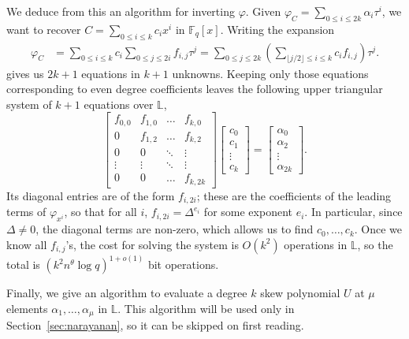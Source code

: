 \documentclass[sigconf]{acmart}
\newcommand{\F}{\mathbb{F}}
\renewcommand{\L}{\mathbb{L}}
\begin{document}
\smallskip{}  We deduce from this an algorithm for
inverting $\varphi$.  Given
$\varphi_C = \sum_{0 \le i \le 2k} \alpha_i \tau^i$, we want to
recover $C =\sum_{0 \le i \le k} c_ix^i $ in $\F_q[x]$. Writing the
expansion
\begin{align*}\label{eq:phic}
\varphi_C &= \sum_{0 \le i \le k} c_i \sum_{0 \le j \le 2i} f_{i,j} \tau^j = \sum_{0 \le j \le 2k}  \left (\sum_{\lfloor j/2\rfloor \le i \le k} c_i f_{i,j} \right) \tau^j.
\end{align*}
gives us $2k+1$ equations in $k+1$
unknowns. Keeping only those equations corresponding to even degree
coefficients leaves the following upper triangular system of $k + 1$
equations over $\L$,
\begin{equation}
\begin{bmatrix} f_{0,0} & f_{1,0} & \ldots & f_{k, 0} \\
                 0      & f_{1,2} & \ldots & f_{k, 2}  \\
                 0      & 0       & \ddots & \vdots                      \\
                 \vdots  & \vdots  &  \ddots      & \vdots                       \\
                 0  & 0 & \ldots & f_{k, 2k}
\end{bmatrix}
\begin{bmatrix}
  c_0 \\ c_1 \\ \vdots \\ c_k
\end{bmatrix} = \begin{bmatrix} \alpha_{0} \\ \alpha_{2} \\ \vdots \\ \alpha_{2k} \end{bmatrix}.
\end{equation}
Its diagonal entries are of the form $f_{i,2i}$; these are the
coefficients of the leading terms of $\varphi_{x^i}$, so that for all
$i$, $f_{i,2i} = \Delta^{e_i}$ for some exponent $e_i$. In particular,
since $\Delta \neq 0$, the diagonal terms are non-zero, which allows
us to find $c_0,\dots,c_{k}$. Once we know all $f_{i,j}$'s, the cost
for solving the system is $O(k^2)$ operations in $\L$, so the total is
$ (k^2 n^{\theta} \log q)^{1+o(1)}$ bit operations.

\smallskip{}  Finally, we give an algorithm to
evaluate a degree $k$ skew polynomial $U$ at $\mu$ elements
$\alpha_1,\dots,\alpha_\mu$ in $\L$. This algorithm will be used
only in Section~\ref{sec:narayanan}, so it can be skipped on first reading.
\end{document}

